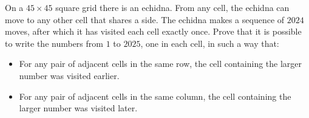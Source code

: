 On a $45\times45$ square grid there is an echidna. From any cell, the echidna can move to any other cell that shares a side. The echidna makes a sequence of $2024$ moves, after which it has visited each cell exactly once. Prove that it is possible to write the numbers from $1$ to $2025$, one in each cell, in such a way that:
\begin{itemize}
\item For any pair of adjacent cells in the same row, the cell containing the larger number was visited earlier.
\item For any pair of adjacent cells in the same column, the cell containing the larger number was visited later.
\end{itemize}
